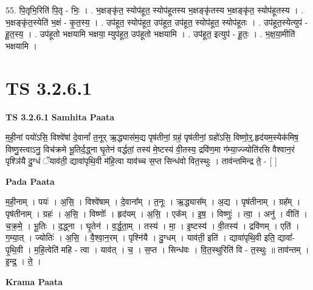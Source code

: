 \documentclass[17pt]{extarticle}
\begin{document}
55. पि॒तृभि॒रिति॑ पि॒तृ - भिः॒ । . भ॒क्षङ्‍कृ॑त॒ स्योप॑हूत॒ स्योप॑हूतस्य भ॒क्षङ्‍कृ॑तस्य भ॒क्षङ्‍कृ॑त॒ स्योप॑हूतस्य । . भ॒क्षङ्‍कृ॑त॒स्येति॑ भ॒क्षं - कृ॒त॒स्य॒ । . उप॑हूत॒ स्योप॑हूत॒ उप॑हूत॒ उप॑हूत॒ स्योप॑हूत॒ स्योप॑हूतः । . उप॑हूत॒स्येत्युप॑ - हू॒त॒स्य॒ । . उप॑हूतो भक्षयामि भक्षया॒ म्युप॑हूत॒ उप॑हूतो भक्षयामि । . उप॑हूत॒ इत्युप॑ - हू॒तः॒ । . भ॒क्ष॒या॒मीति॑ भक्षयामि । \newline


\section{ TS 3.2.6.1 }

\textbf{TS 3.2.6.1 } \newline
\textbf{Samhita Paata} \newline

म॒ही॒नां पयो॑ऽसि॒ विश्वे॑षां दे॒वानां᳚ त॒नूर् ऋ॒द्ध्यास॑म॒द्य पृष॑तीनां॒ ग्रहं॒ पृष॑तीनां॒ ग्रहो॑ऽसि॒ विष्णो॒र्॒.हृद॑यम॒स्येक॑मिष॒ विष्णु॒स्त्वाऽनु॒ विच॑क्रमे भू॒तिर्द॒द्ध्ना घृ॒तेन॑ वर्द्धतां॒ तस्य॑ मे॒ष्टस्य॑ वी॒तस्य॒ द्रवि॑ण॒मा ग॑म्या॒ज्ज्योति॑रसि वैश्वान॒रं पृश्ञि॑यै दु॒ग्धं ॅयाव॑ती॒ द्यावा॑पृथि॒वी म॑हि॒त्वा याव॑च्च स॒प्त सिन्ध॑वो वित॒स्थुः । ताव॑न्तमिन्द्र ते॒ - [  ] \newline

\textbf{Pada Paata} \newline

म॒ही॒नाम् । पयः॑ । अ॒सि॒ । विश्वे॑षाम् । दे॒वाना᳚म् । त॒नूः । ऋ॒द्ध्यास᳚म् । अ॒द्य । पृष॑तीनाम् । ग्रह᳚म् । पृष॑तीनाम् । ग्रहः॑ । अ॒सि॒ । विष्णोः᳚ । हृद॑यम् । अ॒सि॒ । एक᳚म् । इ॒ष॒ । विष्णुः॑ । त्वा॒ । अनु॑ । वीति॑ । च॒क्र॒मे॒ । भू॒तिः । द॒द्ध्ना । घृ॒तेन॑ । व॒र्द्ध॒ता॒म् । तस्य॑ । मा॒ । इ॒ष्टस्य॑ । वी॒तस्य॑ । द्रवि॑णम् । एति॑ । ग॒म्या॒त् । ज्योतिः॑ । अ॒सि॒ । वै॒श्वा॒न॒रम् । पृश्नि॑यै । दु॒ग्धम् । याव॑ती॒ इति॑ । द्यावा॑पृथि॒वी इति॒ द्यावा᳚-पृ॒थि॒वी । म॒हि॒त्वेति॑ महि - त्वा । याव॑त् । च॒ । स॒प्त । सिन्ध॑वः । वि॒त॒स्थुरिति॑ वि - त॒स्थुः ॥ ताव॑न्तम् । इ॒न्द्र॒ । ते॒ ।  \newline


\textbf{Krama Paata} \newline
\end{document}
